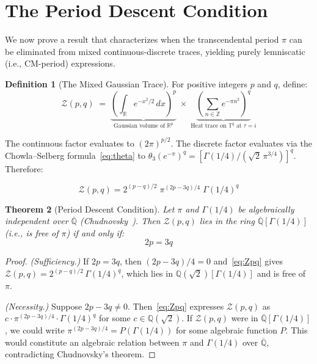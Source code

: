 \documentclass[12pt]{article}
\newtheorem{theorem}{Theorem}[section]
\theoremstyle{definition}
\newtheorem{definition}[theorem]{Definition}
\theoremstyle{remark}
\begin{document}
\section{The Period Descent Condition}
\label{sec:descent}

We now prove a result that characterizes when the transcendental period $\pi$ can be eliminated from mixed continuous-discrete traces, yielding purely lemniscatic (i.e., CM-period) expressions.

\begin{definition}[The Mixed Gaussian Trace]
\label{def:mgt}
For positive integers $p$ and $q$, define:
\begin{equation}
    \mathcal{Z}(p,q) \;=\; \underbrace{\left(\int_{\mathbb{R}} e^{-x^2/2}\,dx\right)^{\!p}}_{\text{Gaussian volume of }\mathbb{R}^p} \;\times\; \underbrace{\left(\sum_{n\in\mathbb{Z}} e^{-\pi n^2}\right)^{\!q}}_{\text{Heat trace on }\mathbb{T}^q\text{ at }\tau=i}
\end{equation}
\end{definition}

The continuous factor evaluates to $(2\pi)^{p/2}$. The discrete factor evaluates via the Chowla--Selberg formula~\eqref{eq:theta} to $\theta_3(e^{-\pi})^q = [\Gamma(1/4)/(\sqrt{2}\,\pi^{3/4})]^q$. Therefore:

\begin{equation}
    \mathcal{Z}(p,q) = 2^{(p-q)/2}\;\pi^{(2p-3q)/4}\;\Gamma(1/4)^q
    \label{eq:Zpq}
\end{equation}

\begin{theorem}[Period Descent Condition]
\label{thm:descent}
Let $\pi$ and $\Gamma(1/4)$ be algebraically independent over $\overline{\mathbb{Q}}$ \emph{(Chudnovsky~\cite{chudnovsky})}. Then $\mathcal{Z}(p,q)$ lies in the ring $\overline{\mathbb{Q}}[\Gamma(1/4)]$ \emph{(}i.e., is free of $\pi$\emph{)} if and only if:
\begin{equation}
    \boxed{\;2p = 3q\;}
\end{equation}
\end{theorem}

\begin{proof}
\emph{(Sufficiency.)} If $2p = 3q$, then $(2p-3q)/4 = 0$ and~\eqref{eq:Zpq} gives $\mathcal{Z}(p,q) = 2^{(p-q)/2}\,\Gamma(1/4)^q$, which lies in $\mathbb{Q}(\sqrt{2})[\Gamma(1/4)]$ and is free of $\pi$.

\emph{(Necessity.)} Suppose $2p - 3q \neq 0$. Then~\eqref{eq:Zpq} expresses $\mathcal{Z}(p,q)$ as $c\cdot\pi^{(2p-3q)/4}\cdot\Gamma(1/4)^q$ for some $c \in \mathbb{Q}(\sqrt{2})$. If $\mathcal{Z}(p,q)$ were in $\overline{\mathbb{Q}}[\Gamma(1/4)]$, we could write $\pi^{(2p-3q)/4} = P(\Gamma(1/4))$ for some algebraic function $P$. This would constitute an algebraic relation between $\pi$ and $\Gamma(1/4)$ over $\overline{\mathbb{Q}}$, contradicting Chudnovsky's theorem.
\end{proof}
\end{document}
